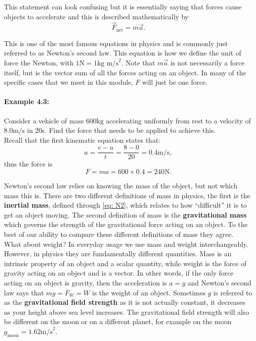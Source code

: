 \documentclass[a4paper,12pt]{book}
\begin{document}
This statement can look confusing but it is essentially saying that forces cause objects to accelerate and this is described mathematically by
\begin{equation}
\vec{F}_{\text{net}}=m\vec{a}.
\label{eq: N2}
\end{equation}

This is one of the most famous equations in physics and is commonly just referred to as Newton's second law. This equation is how we define the unit of force the Newton, with $1 \text{N}=1\text{kg m/s}^{2}$.  Note that $m\vec{a}$ is not necessarily a force itself, but is the vector sum of all the forces acting on an object. In many of the specific cases that we meet in this module, $F$ will just be one force.

\paragraph{Example 4.3:} Consider a vehicle of mass $600\text{kg}$ accelerating uniformly from rest to a velocity of $8.0\text{m/s}$ in $20$s. Find the force that needs to be applied to achieve this.\\

Recall that the first kinematic equation states that:
\begin{equation*}
a=\frac{v-u}{t}=\frac{8-0}{20}=0.4\text{m/s},
\end{equation*}
thus the force is
\begin{equation*}
F=ma=600\times 0.4=240\text{N}.
\end{equation*}

Newton's second law relies on knowing the mass of the object, but not which mass this is. There are two different definitions of mass in physics, the first is the \textbf{inertial mass}, defined through \cref{eq: N2}, which relates to how ``difficult'' it is to get an object moving. The second definition of mass is the \textbf{gravitational mass} which governs the strength of the gravitational force acting on an object. To the best of our ability to compare these different definitions of mass they agree.\\

What about weight? In everyday usage we use mass and weight interchangeably. However, in physics they are fundamentally different quantities. Mass is an intrinsic property of an object and a scalar quantity, while weight is the force of gravity acting on an object and is a vector. In other words, if the only force acting on an object is gravity, then the acceleration is $a=g$ and Newton's second law says that $mg=F_{W}=W$ is the weight of an object. Sometimes $g$ is referred to as the \textbf{gravitational field strength} as it is not actually constant, it decreases as your height above sea level increases.  The gravitational field strength will also be different on the moon or on a different planet, for example on the moon $g_{\text{moon}}=1.62\text{m/s}^{2}$.
\end{document}

